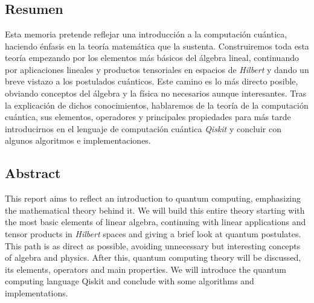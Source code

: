 \chapter*{}
\section*{Resumen}

Esta memoria pretende reflejar una introducción a la computación cuántica, haciendo énfasis en la teoría matemática que la sustenta. Construiremos toda esta teoría empezando por los elementos más básicos del álgebra lineal, continuando por aplicaciones lineales y productos tensoriales en espacios de \textit{Hilbert} y dando un breve vistazo a los postulados cuánticos. Este camino es lo más directo posible, obviando conceptos del álgebra y la física no necesarios aunque interesantes. Tras la explicación de dichos conocimientos, hablaremos de la teoría de la computación cuántica, sus elementos, operadores y principales propiedades para más tarde introducirnos en el lenguaje de computación cuántica \textit{Qiskit} y concluir con algunos algoritmos e implementaciones.

\section*{Abstract}

This report aims to reflect an introduction to quantum computing, emphasizing the mathematical theory behind it. We will build this entire theory starting with the most basic elements of linear algebra, continuing with linear applications and tensor products in \textit{Hilbert} spaces and giving a brief look at quantum postulates. This path is as direct as possible, avoiding unnecessary but interesting concepts of algebra and physics. After this, quantum computing theory will be discussed, its elements, operators and main properties. We will introduce the quantum computing language Qiskit and conclude with some algorithms and implementations.
